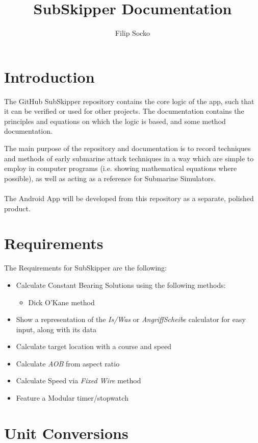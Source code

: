 \documentclass{article}
\author{Filip Socko}
\title{SubSkipper Documentation}
\begin{document}
\maketitle
\pagebreak
\tableofcontents
\pagebreak

\section{Introduction}
The GitHub SubSkipper repository contains the core logic of the app, such that it can be verified or used for other projects. The documentation contains the principles and equations on which the logic is based, and some method documentation.

The main purpose of the repository and documentation is to record techniques and methods of early submarine attack techniques in a way which are simple to employ in computer programs (i.e. showing mathematical equations where possible), as well as acting as a reference for Submarine Simulators.
\\ \\
The Android App will be developed from this repository as a separate, polished product.

\section{Requirements}
The Requirements for SubSkipper are the following:

\begin{itemize}
\item{Calculate Constant Bearing Solutions using the following methods:}
	\begin{itemize}
	\item{Dick O'Kane method}
	\end{itemize}
\item{Show a representation of the \emph{Is/Was} or \emph{AngriffScheibe} calculator for easy input, along with its data}
\item{Calculate target location with a course and speed}
\item{Calculate \emph{AOB} from aspect ratio}
\item{Calculate Speed via \emph{Fixed Wire} method}
\item{Feature a Modular timer/stopwatch}
\end{itemize}



\section{Unit Conversions}
\end{document}

